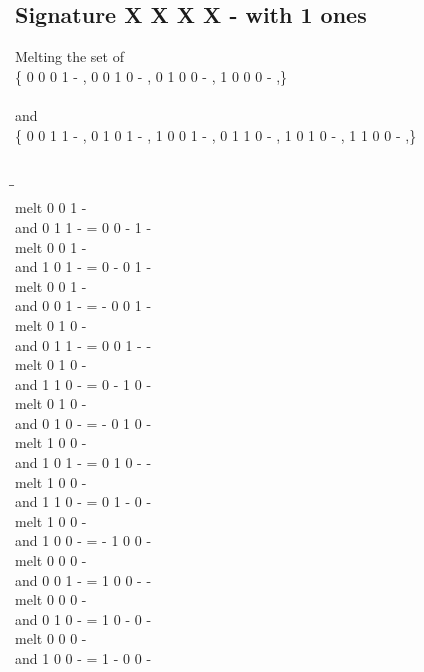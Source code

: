 \documentclass{article}
\begin{document}
\subsection{Signature X X X X - with 1 ones}
Melting the set of\\
\{ 0  0  0  1  - , 0  0  1  0  - , 0  1  0  0  - , 1  0  0  0  - ,\}\\\\
and\\
\{ 0  0  1  1  - , 0  1  0  1  - , 1  0  0  1  - , 0  1  1  0  - , 1  0  1  0  - , 1  1  0  0  - ,\}\\\\
\begin{tabbing}
\hspace{3cm}\=\hspace{3cm}\=\hspace{3cm}\\[1cm]
melt  0  0  1  - \\
and  0  1  1  - \>
 =  0  0  -  1  - \\[1mm]
melt  0  0  1  - \\
and  1  0  1  - \>
 =  0  -  0  1  - \\[1mm]
melt  0  0  1  - \\
and  0  0  1  - \>
 =  -  0  0  1  - \\[1mm]
melt  0  1  0  - \\
and  0  1  1  - \>
 =  0  0  1  -  - \\[1mm]
melt  0  1  0  - \\
and  1  1  0  - \>
 =  0  -  1  0  - \\[1mm]
melt  0  1  0  - \\
and  0  1  0  - \>
 =  -  0  1  0  - \\[1mm]
melt  1  0  0  - \\
and  1  0  1  - \>
 =  0  1  0  -  - \\[1mm]
melt  1  0  0  - \\
and  1  1  0  - \>
 =  0  1  -  0  - \\[1mm]
melt  1  0  0  - \\
and  1  0  0  - \>
 =  -  1  0  0  - \\[1mm]
melt  0  0  0  - \\
and  0  0  1  - \>
 =  1  0  0  -  - \\[1mm]
melt  0  0  0  - \\
and  0  1  0  - \>
 =  1  0  -  0  - \\[1mm]
melt  0  0  0  - \\
and  1  0  0  - \>
 =  1  -  0  0  - \\[1mm]
\end{tabbing}
\newpage
\end{document}
